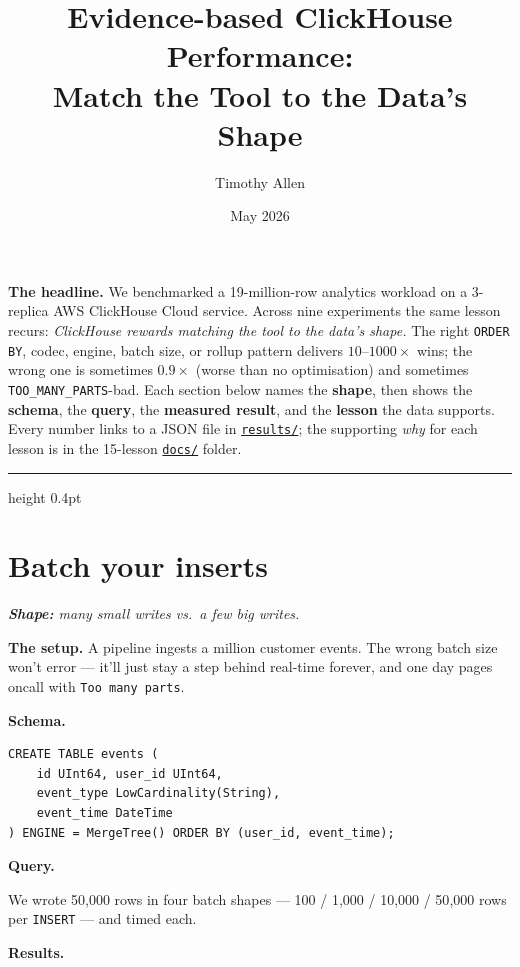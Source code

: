 \documentclass[11pt]{article}
\title{\Large\bfseries Evidence-based ClickHouse Performance:\\
  Match the Tool to the Data's Shape}
\author{Timothy Allen}
\date{May 2026}
\newcommand{\shape}[1]{%
  \par\noindent\textit{\textbf{Shape:} #1}\par\smallskip}
\newcommand{\schemaHd}{%
  \par\smallskip\noindent\textbf{\color{accentblue}Schema.}\par\nopagebreak\smallskip}
\newcommand{\queryHd}{%
  \par\smallskip\noindent\textbf{\color{accentblue}Query.}\par\nopagebreak\smallskip}
\newcommand{\resultsHd}{%
  \par\smallskip\noindent\textbf{\color{accentblue}Results.}\par\nopagebreak\smallskip}
\begin{document}
\maketitle
\thispagestyle{empty}
\vspace{-1.2em}

\noindent
\textbf{\color{accentblue}The headline.}
We benchmarked a 19-million-row analytics workload on a 3-replica AWS
ClickHouse Cloud service. Across nine experiments the same lesson
recurs: \emph{ClickHouse rewards matching the tool to the data's
shape.} The right \texttt{ORDER BY}, codec, engine, batch size, or
rollup pattern delivers $10$--$1000\times$ wins; the wrong one is
sometimes $0.9\times$ (worse than no optimisation) and sometimes
\texttt{TOO\_MANY\_PARTS}-bad. Each section below names the
\textbf{shape}, then shows the \textbf{schema}, the \textbf{query},
the \textbf{measured result}, and the \textbf{lesson} the data
supports. Every number links to a JSON file in
\href{run:results/}{\texttt{results/}};
the supporting \emph{why} for each lesson is in the 15-lesson
\href{run:docs/}{\texttt{docs/}} folder.

\medskip
\hrule height 0.4pt
\medskip

\section{Batch your inserts}

\shape{many small writes vs.\ a few big writes.}

\textbf{The setup.} A pipeline ingests a million customer events.
The wrong batch size won't error — it'll just stay a step behind real-time
forever, and one day pages oncall with \texttt{Too many parts}.

\schemaHd
\begin{lstlisting}
CREATE TABLE events (
    id UInt64, user_id UInt64,
    event_type LowCardinality(String),
    event_time DateTime
) ENGINE = MergeTree() ORDER BY (user_id, event_time);
\end{lstlisting}

\queryHd
We wrote 50{,}000 rows in four batch shapes — 100 / 1{,}000 / 10{,}000 /
50{,}000 rows per \texttt{INSERT} — and timed each.

\resultsHd
\end{document}
